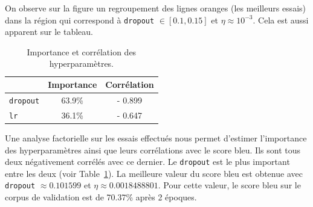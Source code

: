 On observe sur la figure un regroupement des lignes oranges (les meilleurs essais) 
dans la région qui correspond à \verb|dropout| \(\in[0.1, 0.15]\) et \(\eta\approx 10 ^{-3}\).
Cela est aussi apparent sur le tableau.
\begin{table}[hbt]
    \begin{center}
        \begin{tabular}{|l|c|c|}
            \cline{2-3}
            \multicolumn{1}{c|}{} & Importance & Corrélation \\
            \hline
            \verb|dropout|        & 63.9\%     & - 0.899     \\
            \hline
            \verb|lr|             & 36.1\%     & - 0.647     \\
            \hline
        \end{tabular}
    \end{center}
    \caption{Importance et corrélation des hyperparamètres.}
    \label{tab.results.hparam.corr}
\end{table}
Une analyse factorielle sur les essais effectués nous permet d'estimer l'importance des hyperparamètres 
ainsi que leurs corrélations avec le score \gls{bleu}.
Ils sont tous deux négativement corrélés avec ce dernier.
Le \verb|dropout| est le plus important entre les deux (voir Table~\ref{tab.results.hparam.corr}).
La meilleure valeur du score \gls{bleu} est obtenue 
avec \verb|dropout| \(\approx 0.101599\) et \(\eta\approx 0.0018488801\).
Pour cette valeur, le score \gls{bleu} sur le corpus de validation est de 70.37\% après 2 époques.